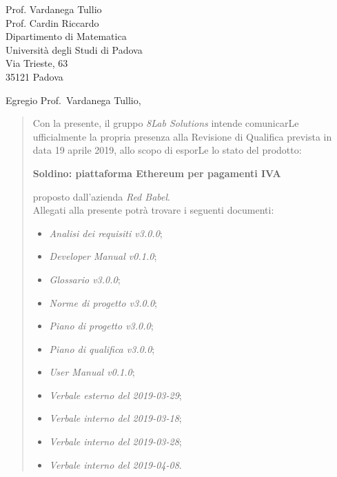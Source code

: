 
\begin{letter}{
		Prof. Vardanega Tullio \\
		Prof. Cardin Riccardo \\
		Dipartimento di Matematica \\
		Università degli Studi di Padova \\
		Via Trieste, 63 \\
		35121 Padova}
		
\opening{Egregio Prof.~Vardanega Tullio,}

\begin{quotation}
Con la presente, il gruppo \textit{8Lab Solutions} intende 
comunicarLe ufficialmente la propria presenza alla Revisione di 
Qualifica prevista in data 19 aprile 2019, allo scopo di 
esporLe lo stato del prodotto:

\begin{center}
	\textbf{Soldino: piattaforma Ethereum per pagamenti IVA}
\end{center}

\noindent proposto dall'azienda \textit{Red Babel}. \\
Allegati alla presente potrà trovare i seguenti documenti:

\begin{itemize}
	\item \textit{Analisi dei requisiti v3.0.0};
	
	\item \textit{Developer Manual v0.1.0};
	
	\item \textit{Glossario v3.0.0};
	
	\item \textit{Norme di progetto v3.0.0};

	\item \textit{Piano di progetto v3.0.0};

	\item \textit{Piano di qualifica v3.0.0};
	
	\item \textit{User Manual v0.1.0};
	
	
	\item \textit{Verbale esterno del 2019-03-29};
	\item \textit{Verbale interno del 2019-03-18};
	\item \textit{Verbale interno del 2019-03-28};
	\item \textit{Verbale interno del 2019-04-08}.
\end{itemize}
	



\end{quotation}
\end{letter}
